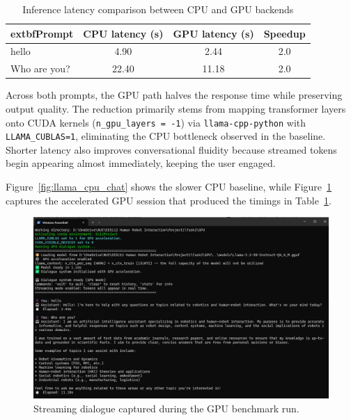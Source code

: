 \documentclass[12pt,a4paper]{article}
\begin{document}
\begin{table}[H]
    \centering
    \caption{Inference latency comparison between CPU and GPU backends}
    \label{tab:cpu_gpu_latency}
    \begin{tabular}{|l|c|c|c|}
        \hline
        	extbf{Prompt} & \textbf{CPU latency (s)} & \textbf{GPU latency (s)} & \textbf{Speedup} \\
        \hline
        hello & 4.90 & 2.44 & 2.0\texttimes{} \\
        Who are you? & 22.40 & 11.18 & 2.0\texttimes{} \\
        \hline
    \end{tabular}
\end{table}

Across both prompts, the GPU path halves the response time while preserving output quality. The reduction primarily stems from mapping transformer layers onto CUDA kernels (\texttt{n\_gpu\_layers = -1}) via \texttt{llama-cpp-python} with \texttt{LLAMA\_CUBLAS=1}, eliminating the CPU bottleneck observed in the baseline. Shorter latency also improves conversational fluidity because streamed tokens begin appearing almost immediately, keeping the user engaged.

Figure~\ref{fig:llama_cpu_chat} shows the slower CPU baseline, while Figure~\ref{fig:llama_gpu_chat} captures the accelerated GPU session that produced the timings in Table~\ref{tab:cpu_gpu_latency}.

\begin{figure}[H]
    \centering
    \includegraphics[width=1\linewidth]{Figures/llamaGPU.png}
    \caption{Streaming dialogue captured during the GPU benchmark run.}
    \label{fig:llama_gpu_chat}
\end{figure}
\end{document}
